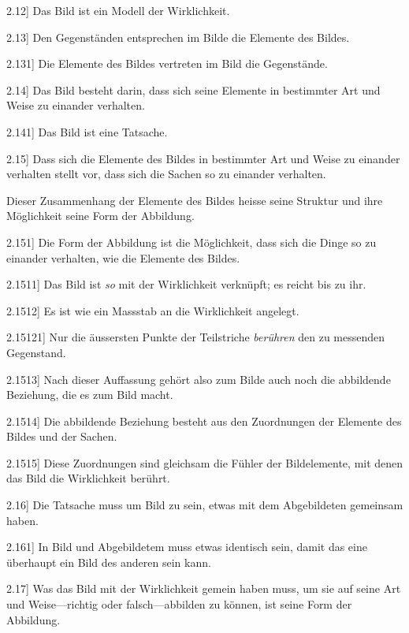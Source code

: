 \documentclass[12pt,oneside]{book}[2007/10/19]
\newcommand{\PropERef}[1]{\hyperref[PropE:#1]{#1}}
\newcommand{\PropositionG}[2]{%
  \item[\phantomsection\label{PropG:#1}\PropERef{#1}] #2%
}
\newcommand{\DPtypo}[2]{#2}
\newcommand{\Emph}[1]{\emph{#1}}%
\begin{document}
\begin{propositions}
\PropositionG{2.12}
{Das Bild ist ein Modell der Wirklichkeit.}


\PropositionG{2.13}
{Den Gegenständen entsprechen im Bilde die
Elemente des Bildes.}


\PropositionG{2.131}
{Die Elemente des Bildes vertreten im Bild die
Gegenstände.}


\PropositionG{2.14}
{Das Bild besteht darin, dass sich seine Elemente
in bestimmter Art und Weise zu einander verhalten.}


\PropositionG{2.141}
{Das Bild ist eine Tatsache.}


\PropositionG{2.15}
{Dass sich die Elemente des Bildes in bestimmter
Art und Weise zu einander verhalten stellt vor,
dass sich die Sachen so zu einander verhalten.

Dieser Zusammenhang der Elemente des Bildes
heisse seine Struktur und ihre Möglichkeit seine
Form der Abbildung.}


\PropositionG{2.151}
{Die Form der Abbildung ist die Möglichkeit,
dass sich die Dinge so zu einander verhalten, wie
die Elemente des Bildes.}


\PropositionG{2.1511}
{Das Bild ist \Emph{so} mit der Wirklichkeit verknüpft;
es reicht bis zu ihr.}


\PropositionG{2.1512}
{Es ist wie ein \DPtypo{Masstab}{Massstab} an die Wirklichkeit
angelegt.}


\PropositionG{2.15121}
{Nur die äussersten Punkte der Teilstriche
\Emph{berühren} den zu messenden Gegenstand.}


\PropositionG{2.1513}
{Nach dieser Auffassung gehört also zum Bilde
auch noch die abbildende Beziehung, die es zum
Bild macht.}


\PropositionG{2.1514}
{Die abbildende Beziehung besteht aus den
Zuordnungen der Elemente des Bildes und der
Sachen.}


\PropositionG{2.1515}
{Diese Zuordnungen sind gleichsam die Fühler
der \DPtypo{Bildelmente}{Bildelemente}, mit denen das Bild die Wirklichkeit
berührt.}


\PropositionG{2.16}
{Die Tatsache muss um Bild zu sein, etwas mit
dem Abgebildeten gemeinsam haben.}


\PropositionG{2.161}
{In Bild und Abgebildetem muss etwas identisch
sein, damit das eine überhaupt ein Bild des anderen
sein kann.}


\PropositionG{2.17}
{Was das Bild mit der Wirklichkeit gemein
haben muss, um sie auf seine Art und Weise---richtig
oder falsch---abbilden zu können, ist seine
Form der Abbildung.}



\end{propositions}
\end{document}
